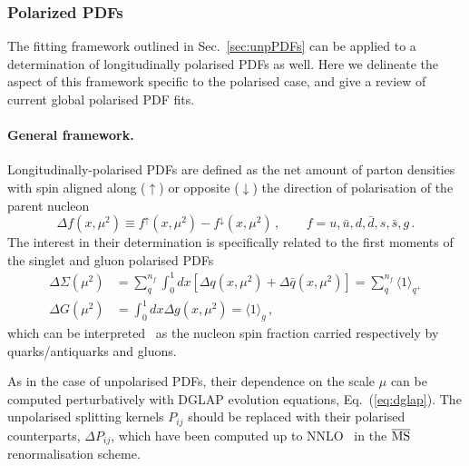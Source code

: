 \subsubsection{Polarized PDFs}
\label{sec:polPDFs}

The fitting framework outlined in Sec.~\ref{sec:unpPDFs} can be applied
to a determination of longitudinally polarised PDFs as well.
%
Here we delineate the aspect of this framework specific to the polarised
case, and give a review of current global polarised PDF fits.

\paragraph{General framework.}
%
Longitudinally-polarised PDFs are defined as the net amount of parton 
densities with spin aligned along ($\uparrow$) or opposite ($\downarrow$)
the direction of polarisation of the parent nucleon
\begin{equation}
\Delta f(x,\mu^2) \equiv f^{\uparrow}(x,\mu^2) - f^{\downarrow}(x,\mu^2)
\,\mbox{,}
\ \ \ \ \ \ \ \ \ \
f=u,\bar{u},d,\bar{d},s,\bar{s},g
\,\mbox{.}
\label{eq:polPDFs}
\end{equation}
%
The interest in their determination is specifically related to the
first moments of the singlet and gluon polarised PDFs
\begin{align}
\Delta\Sigma(\mu^2)
& =
\sum_{q}^{n_f}\int_0^1 dx 
\left[\Delta q(x, \mu^2) + \Delta\bar{q}(x, \mu^2)\right]
=
\sum_q^{n_f}\langle 1 \rangle_{q^+}
\\
\Delta G(\mu^2)
& =
\int_0^1 dx \Delta g(x,\mu^2)
=
\langle 1 \rangle_g
\,,
\label{eq:moments}
\end{align}
which can be interpreted~\cite{} as the nucleon spin fraction carried 
respectively by quarks/antiquarks and gluons.

As in the case of unpolarised PDFs, their dependence on the scale $\mu$ can 
be computed perturbatively with DGLAP evolution equations, 
Eq.~(\ref{eq:dglap}).
%
The unpolarised splitting kernels $P_{ij}$ should be replaced with their
polarised counterparts, $\Delta P_{ij}$, which have been computed up to 
NNLO~\cite{} in the $\overline{\rm MS}$ renormalisation scheme.

